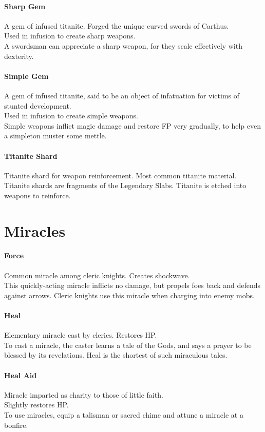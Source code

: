 \documentclass[twocolumn,a4paper]{article}
\begin{document}
\paragraph{Sharp Gem}
A gem of infused titanite. Forged the unique curved swords of Carthus.\\
Used in infusion to create sharp weapons.\\
A swordsman can appreciate a sharp weapon, for they scale effectively with dexterity.
\paragraph{Simple Gem}
A gem of infused titanite, said to be an object of infatuation for victims of stunted development.\\
Used in infusion to create simple weapons.\\
Simple weapons inflict magic damage and restore FP very gradually, to help even a simpleton muster some mettle.
\paragraph{Titanite Shard}
Titanite shard for weapon reinforcement. Most common titanite material.\\
Titanite shards are fragments of the Legendary Slabs. Titanite is etched into weapons to reinforce.
\section*{Miracles}
\paragraph{Force}
Common miracle among cleric knights. Creates shockwave.\\
This quickly-acting miracle inflicts no damage, but propels foes back and defends against arrows. Cleric knights use this miracle when charging into enemy mobs.
\paragraph{Heal}
Elementary miracle cast by clerics. Restores HP.\\
To cast a miracle, the caster learns a tale of the Gods, and says a prayer to be blessed by its revelations. Heal is the shortest of such miraculous tales.
\paragraph{Heal Aid}
Miracle imparted as charity to those of little faith.\\
Slightly restores HP.\\
To use miracles, equip a talisman or sacred chime and attune a miracle at a bonfire.
\end{document}
